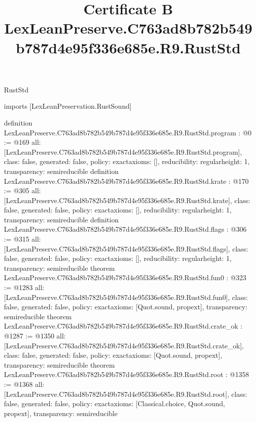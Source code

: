 \begin{lexlean}{RustStd}
\title{Certificate B LexLeanPreserve.C763ad8b782b549b787d4e95f336e685e.R9.RustStd}
\begin{coremodule}
imports [LexLeanPreservation.RustSound]

definition LexLeanPreserve.C763ad8b782b549b787d4e95f336e685e.R9.RustStd.program : @0 := @169 {
  all: [LexLeanPreserve.C763ad8b782b549b787d4e95f336e685e.R9.RustStd.program],
  class: false,
  generated: false,
  policy: exact{axioms: []},
  reducibility: regular{height: 1},
  transparency: semireducible
}
definition LexLeanPreserve.C763ad8b782b549b787d4e95f336e685e.R9.RustStd.krate : @170 := @305 {
  all: [LexLeanPreserve.C763ad8b782b549b787d4e95f336e685e.R9.RustStd.krate],
  class: false,
  generated: false,
  policy: exact{axioms: []},
  reducibility: regular{height: 1},
  transparency: semireducible
}
definition LexLeanPreserve.C763ad8b782b549b787d4e95f336e685e.R9.RustStd.flags : @306 := @315 {
  all: [LexLeanPreserve.C763ad8b782b549b787d4e95f336e685e.R9.RustStd.flags],
  class: false,
  generated: false,
  policy: exact{axioms: []},
  reducibility: regular{height: 1},
  transparency: semireducible
}
theorem LexLeanPreserve.C763ad8b782b549b787d4e95f336e685e.R9.RustStd.fun0 : @323 := @1283 {
  all: [LexLeanPreserve.C763ad8b782b549b787d4e95f336e685e.R9.RustStd.fun0],
  class: false,
  generated: false,
  policy: exact{axioms: [Quot.sound, propext]},
  transparency: semireducible
}
theorem LexLeanPreserve.C763ad8b782b549b787d4e95f336e685e.R9.RustStd.crate_ok : @1287 := @1350 {
  all: [LexLeanPreserve.C763ad8b782b549b787d4e95f336e685e.R9.RustStd.crate_ok],
  class: false,
  generated: false,
  policy: exact{axioms: [Quot.sound, propext]},
  transparency: semireducible
}
theorem LexLeanPreserve.C763ad8b782b549b787d4e95f336e685e.R9.RustStd.root : @1358 := @1368 {
  all: [LexLeanPreserve.C763ad8b782b549b787d4e95f336e685e.R9.RustStd.root],
  class: false,
  generated: false,
  policy: exact{axioms: [Classical.choice, Quot.sound, propext]},
  transparency: semireducible
}


\end{coremodule}
\end{lexlean}
